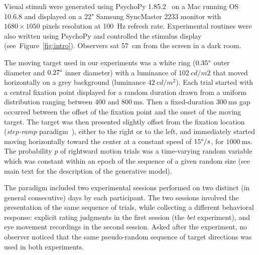 \documentclass[10pt,letterpaper]{article}
\newcommand{\ms}{\si{\milli\second}}%
\newcommand{\citep}[1]{\cite{#1}}
\newcommand{\citet}[1]{\cite{#1}}
\newcommand{\seeFig}[1]{Figure~\ref{fig:#1}}
\begin{document}
Visual stimuli were generated using PsychoPy 1.85.2~\citep{Peirce19} on a Mac running OS 10.6.8 and displayed on a 22" Samsung SyncMaster 2233 monitor with $1680\times 1050$ pixels resolution at 100~\si{\Hz} refresh rate. Experimental routines were also written using PsychoPy and controlled the stimulus display (see~\seeFig{intro}). Observers sat 57~\si{\cm} from the screen in a dark room.

The moving target used in our experiments was a white ring ($0.35\degree$ outer diameter and $0.27\degree$ inner diameter) with a luminance of $102~cd/m2$ that moved horizontally on a grey background (luminance $42~cd/m^2$). Each trial started with a central fixation point displayed for a random duration drawn from a uniform distribution ranging between $400$ and $800~\ms$. Then a fixed-duration $300~\ms$ gap occurred between the offset of the fixation point and the onset of the moving target. The target was then presented slightly offset from the fixation location (\emph{step-ramp} paradigm~\citet{Rashbass1961}), either to the right or to the left, and immediately started moving horizontally toward the center at a constant speed of $15\degree/s$,  for $1000~\ms$. The probability $p$ of rightward motion trials was a time-varying random variable which was constant within an epoch of the sequence of a given random size (see main text for the description of the generative model).

The paradigm included two experimental sessions performed on two distinct (in general consecutive) days by each participant. The two sessions involved the presentation of the same sequence of trials, while collecting a different behavioral response: explicit rating judgments in the first session (the \textit{bet} experiment), and eye movement recordings in the second session. Asked after the experiment, no observer noticed that the same pseudo-random sequence of target directions was used in both experiments.
\end{document}
